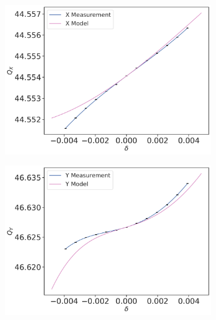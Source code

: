 \begin{figure}[!htb]
    \centering
    \begin{subfigure}[b]{0.49\textwidth}
        \includegraphics[width=\linewidth]{images/kek/chromaticity/LER_09/qx_modelq0q1.pdf}
        \caption{}
    \end{subfigure}
    \begin{subfigure}[b]{0.49\textwidth}
        \includegraphics[width=\linewidth]{images/kek/chromaticity/LER_09/qy_modelq0q1.pdf}
        \caption{}
    \end{subfigure}
    \caption{}
    \label{fig:kek:chroma_LER_detuned}
\end{figure}


